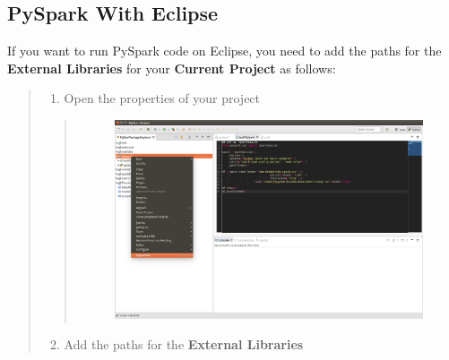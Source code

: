 \documentclass[letterpaper,11pt,english]{sphinxmanual}
\begin{document}
\subsection{PySpark With Eclipse}
\label{setup:pyspark-with-eclipse}
If you want to run PySpark code on Eclipse, you need to add the
paths for the \textbf{External Libraries} for your \textbf{Current Project}
as follows:
\begin{quote}
\begin{enumerate}
\item {} 
Open the properties of your project

\end{enumerate}
\begin{quote}
\begin{figure}[htbp]
\centering

\includegraphics{PyDevProperties.png}
\label{setup:fig-pydevproperties}\end{figure}
\end{quote}
\begin{enumerate}
\setcounter{enumi}{1}
\item {} 
Add the paths for the \textbf{External Libraries}

\end{enumerate}
\begin{quote}
\begin{figure}[htbp]
\centering


\end{figure}
\end{quote}
\end{quote}
\end{document}
